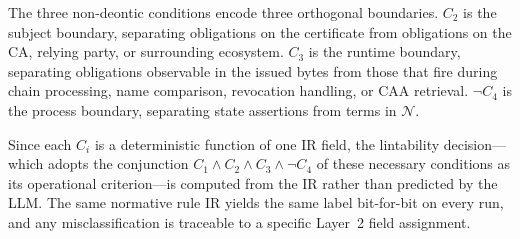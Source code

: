 The three non-deontic conditions encode three orthogonal boundaries. $C_2$ is the subject boundary, separating obligations on the certificate from obligations on the CA, relying party, or surrounding ecosystem. $C_3$ is the runtime boundary, separating obligations observable in the issued bytes from those that fire during chain processing, name comparison, revocation handling, or CAA retrieval. $\neg C_4$ is the process boundary, separating state assertions from terms in $\mathcal{N}$.

Since each $C_i$ is a deterministic function of one IR field, the lintability
decision---which adopts the conjunction $C_1\wedge C_2\wedge C_3\wedge\neg C_4$ of
these necessary conditions as its operational criterion---is computed from
the IR rather than predicted by the LLM. The same normative rule IR yields the same label bit-for-bit on every run, and any misclassification is traceable to a specific Layer~2 field assignment.
